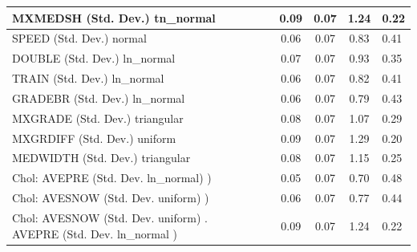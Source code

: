 \begin{table}
\begin{center}
\begin{tabular}{|l|l|c|c|c|l|}
			MXMEDSH (Std. Dev.) tn_normal &  & 0.09 & 0.07 & 1.24 & 0.22 \\
			\hline
			SPEED (Std. Dev.) normal &  & 0.06 & 0.07 & 0.83 & 0.41 \\
			\hline
			DOUBLE (Std. Dev.) ln_normal &  & 0.07 & 0.07 & 0.93 & 0.35 \\
			\hline
			TRAIN (Std. Dev.) ln_normal &  & 0.06 & 0.07 & 0.82 & 0.41 \\
			\hline
			GRADEBR (Std. Dev.) ln_normal &  & 0.06 & 0.07 & 0.79 & 0.43 \\
			\hline
			MXGRADE (Std. Dev.) triangular &  & 0.08 & 0.07 & 1.07 & 0.29 \\
			\hline
			MXGRDIFF (Std. Dev.) uniform &  & 0.09 & 0.07 & 1.29 & 0.20 \\
			\hline
			MEDWIDTH (Std. Dev.) triangular &  & 0.08 & 0.07 & 1.15 & 0.25 \\
			\hline
			 Chol: AVEPRE (Std. Dev. ln_normal) ) &  & 0.05 & 0.07 & 0.70 & 0.48 \\
			\hline
			 Chol: AVESNOW (Std. Dev. uniform) ) &  & 0.06 & 0.07 & 0.77 & 0.44 \\
			\hline
			 Chol: AVESNOW (Std. Dev. uniform) . AVEPRE (Std. Dev.   ln_normal ) &  & 0.09 & 0.07 & 1.24 & 0.22 \\
			\hline
		\end{tabular}
	\end{center}
\end{table}